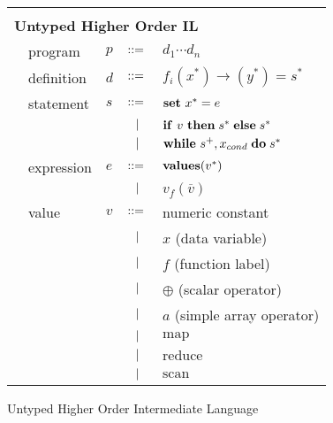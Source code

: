 \documentclass[preprint]{sigplanconf}
\begin{document}
\begin{figure}
  \begin{tabular}{| m{0.01cm}m{1.5cm}m{0.1cm}m{0.2cm}p{4.5cm} |}
  \hline
  & & & &\\ 
   \multicolumn{5}{|l|}{\textbf{Untyped Higher Order IL}}  \\[4pt]
  & program & $p$ &  $::=$   &  $d_1 \cdots d_n $ \\[4pt]
  & definition & $d$ & $::=$ & $f_i(x^*) \rightarrow (y^*) = s^*$ \\[4pt]
  & statement  & $s$ & $::=$ & $\mbox{\textbf{set}} ~ x^* = e $\\[2pt]
  &            &     & $\ \ | \ \ $    & $\mbox{\textbf{if}} ~v~ \mbox{\textbf{then}} \;s^*\; \mbox{\textbf{else}} \;s^*$ \\[2pt]
  &            &     & $\ \ | \ \ $    & $\mbox{\textbf{while}} ~s^+, x_{cond} \; \mbox{\textbf{do}} \;s^*\; $  \\[5pt]
  & expression & $e$ & $::=$ & $\mbox{\textbf{values}} (v^*)$ \\[2pt]
  &            &     & $\ \ | \ \ $    & $ v_f (\overline{v}) $ \\[5pt]
  & value      & $v$ & $::=$ & numeric constant\\[2pt]
  &            &     & $\ \ | \ \ $    &  $x$  \quad \small{(data variable)} \\[2pt]
  &            &     & $\ \ | \ \ $    &  $f$  \quad \small{(function label)} \\[2pt]
  &            &     & $\ \ | \ \ $    &  $\oplus$ \quad \small{(scalar operator)} \\[2pt]
  &            &     & $\ \ | \ \ $    &  $a$ \quad \small{(simple array operator)} \\[2pt]
  &            &     & $\ \ | \ \ $    &  $\textrm{map}$ \\[2pt]
  &            &     & $\ \ | \ \ $    &  $\textrm{reduce}$ \\[2pt]
  &            &     & $\ \ | \ \ $    &  $\textrm{scan}$ \\[9pt]
  \hline
  \end{tabular}
\caption{Untyped Higher Order Intermediate Language}
\end{figure}
\end{document}
